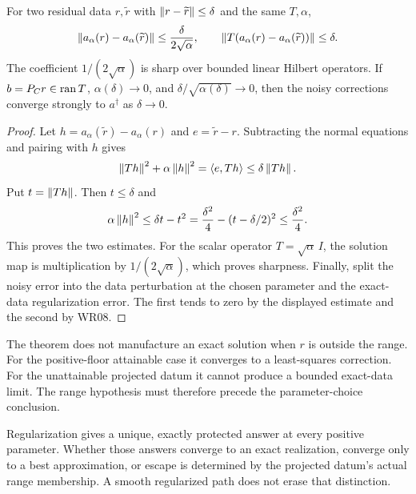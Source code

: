 \begin{theorem}\label{WR09}
For two residual data $r,\widetilde r$ with $\left\lVert r-\widetilde r\right\rVert\le\delta$ and the same $T,\alpha$,
\[
 \left\lVert a_\alpha(r)-a_\alpha(\widetilde r)\right\rVert
 \le\frac{\delta}{2\sqrt\alpha},\qquad
 \left\lVert T(a_\alpha(r)-a_\alpha(\widetilde r))\right\rVert\le\delta.
\]
The coefficient $1/(2\sqrt\alpha)$ is sharp over bounded linear Hilbert operators. If $b=P_Cr\in\operatorname{ran} T$, $\alpha(\delta)\to0$, and $\delta/\sqrt{\alpha(\delta)}\to0$, then the noisy corrections converge strongly to $a^\dagger$ as $\delta\to0$.
\end{theorem}
\begin{proof}
Let $h=a_\alpha(\widetilde r)-a_\alpha(r)$ and $e=\widetilde r-r$. Subtracting the normal equations and pairing with $h$ gives
\[
 \left\lVert Th\right\rVert^2+\alpha\left\lVert h\right\rVert^2=\langle e,Th\rangle
 \le\delta\left\lVert Th\right\rVert.
\]
Put $t=\left\lVert Th\right\rVert$. Then $t\le\delta$ and
\[
 \alpha\left\lVert h\right\rVert^2\le\delta t-t^2
 =\frac{\delta^2}{4}-(t-\delta/2)^2\le\frac{\delta^2}{4}.
\]
This proves the two estimates. For the scalar operator $T=\sqrt\alpha\,I$, the solution map is multiplication by $1/(2\sqrt\alpha)$, which proves sharpness. Finally, split the noisy error into the data perturbation at the chosen parameter and the exact-data regularization error. The first tends to zero by the displayed estimate and the second by WR08.
\end{proof}

The theorem does not manufacture an exact solution when $r$ is outside the range. For the positive-floor attainable case it converges to a least-squares correction. For the unattainable projected datum it cannot produce a bounded exact-data limit. The range hypothesis must therefore precede the parameter-choice conclusion.


\begin{insight}
Regularization gives a unique, exactly protected answer at every positive parameter. Whether those answers converge to an exact realization, converge only to a best approximation, or escape is determined by the projected datum's actual range membership. A smooth regularized path does not erase that distinction.
\end{insight}
